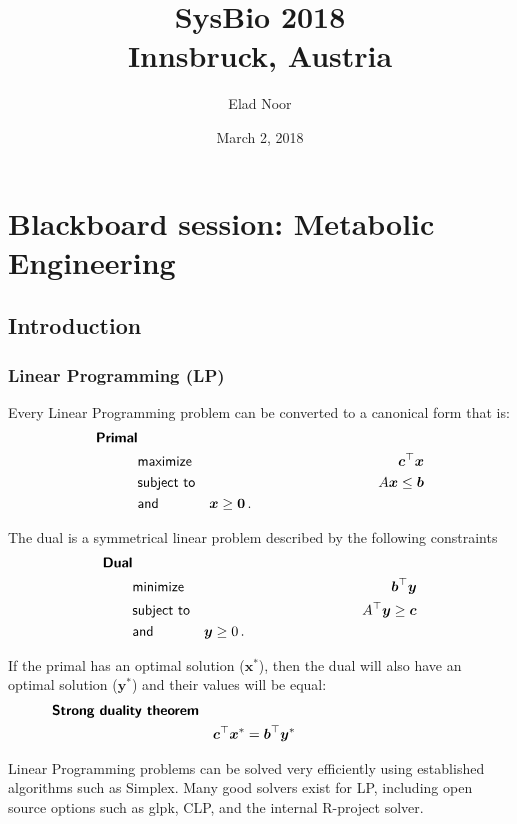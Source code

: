 \documentclass[10pt,a4paper]{article}
\date{March 2, 2018}
\title{\textbf{SysBio 2018}\\Innsbruck, Austria}
\author{Elad Noor}
\newcommand{\mymatrix}[1]{#1}
\newcommand{\myvector}[1]{{\boldsymbol{#1}}}
\begin{document}
\maketitle
\tableofcontents

\section{Blackboard session: Metabolic Engineering}

\subsection{Introduction}
\subsubsection{Linear Programming (LP)}
Every Linear Programming problem can be converted to a canonical form that is:
\begin{eqnarray}
	\textsf{\textbf{Primal}}&&\nonumber\\
	&\textsf{maximize}&\myvector{c}^\top\myvector{x}\nonumber\\
	&\textsf{subject to}&\mymatrix{A}\myvector{x} \leq \myvector{b}\nonumber\\
	&\textsf{and}&\myvector{x}\geq \myvector{0}\,.~~~~~~~~~~~~~~~~~~~~~~~~~~~~~~~~~~~~~
\end{eqnarray}

The dual is a symmetrical linear problem described by the following constraints
\begin{eqnarray}
	\textsf{\textbf{Dual}}&&\nonumber\\
	&\textsf{minimize}&\myvector{b}^\top\myvector{y}\nonumber\\
	&\textsf{subject to}&\mymatrix{A}^\top\myvector{y} \geq \myvector{c}\nonumber\\
	&\textsf{and}&\myvector{y}\geq 0\,.~~~~~~~~~~~~~~~~~~~~~~~~~~~~~~~~~~~~~
\end{eqnarray}

If the primal has an optimal solution ($\myvector{x}^*$), then the dual will also have an optimal solution ($\myvector{y}^*$) and their values will be equal:
\begin{eqnarray}
	\textsf{\textbf{Strong duality theorem}}&&\nonumber\\
	&&\myvector{c}^\top\myvector{x}^* = \myvector{b}^\top\myvector{y}^*~~~~~~~~~~~~~~~~~~~~~~~~~~~~~~~~~~~~~
\end{eqnarray}

Linear Programming problems can be solved very efficiently using established algorithms such as Simplex. Many good solvers exist for LP, including open source options such as glpk, CLP, and the internal R-project solver.
\end{document}
